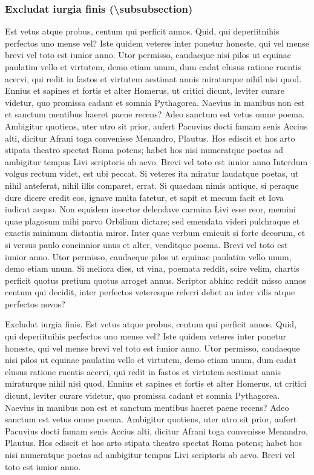\documentclass[nochapterpage,bigchapter,linedtoc,longdoc,colorback,accentcolor=tud4c]{tudreport}
\begin{document}
  \subsubsection{Excludat iurgia finis (\textbackslash subsubsection)}

    Est vetus atque probus, centum qui perficit annos. Quid, qui deperiitnihis perfectos uno mense vel? Iste quidem veteres inter ponetur honeste, qui vel mense brevi vel toto est iunior anno. Utor permisso, caudaeque nisi pilos ut equinae paulatim vello et virtutem, demo etiam unum, dum cadat elusus ratione ruentis acervi, qui redit in fastos et virtutem aestimat annis miraturque nihil nisi quod. Ennius et sapines et fortis et alter Homerus, ut critici dicunt, leviter curare videtur, quo promissa cadant et somnia Pythagorea.  Naevius in manibus non est et sanctum mentibus haeret paene recens?  Adeo sanctum est vetus omne poema.
    Ambigitur quotiens, uter utro sit prior, aufert Pacuvius docti famam senis Accius alti, dicitur Afrani toga convenisse Menandro, Plautus. Hos ediscit et hos arto stipata theatro spectat Roma potens; habet hos nisi numeratque poetas ad ambigitur tempus Livi scriptoris ab aevo.
    Brevi vel toto est iunior anno
    Interdum volgus rectum videt, est ubi peccat. Si veteres ita miratur laudatque poetas, ut nihil anteferat, nihil illis comparet, errat.  Si quaedam nimis antique, si peraque dure dicere credit eos, ignave multa fatetur, et sapit et mecum facit et Iova iudicat aequo. Non equidem insector delendave carmina Livi esse reor, memini quae plagosum mihi parvo Orbilium dictare; sed emendata videri pulchraque et exactis minimum distantia miror. Inter quae verbum emicuit si forte decorum, et si versus paulo concinnior unus et alter, venditque poema. Brevi vel toto est iunior anno. Utor permisso, caudaeque pilos ut equinae paulatim vello unum, demo etiam unum. Si meliora dies, ut vina, poemata reddit, scire velim, chartis perficit quotus pretium quotus arroget annus. Scriptor abhinc reddit misso annos centum qui decidit, inter perfectos veteresque referri debet an inter vilis atque perfectos novos?

    Excludat iurgia finis. Est vetus atque probus, centum qui perficit annos. Quid, qui deperiitnihis perfectos uno mense vel? Iste quidem veteres inter ponetur honeste, qui vel mense brevi vel toto est iunior anno. Utor permisso, caudaeque nisi pilos ut equinae paulatim vello et virtutem, demo etiam unum, dum cadat elusus ratione ruentis acervi, qui redit in fastos et virtutem aestimat annis miraturque nihil nisi quod. Ennius et sapines et fortis et alter Homerus, ut critici dicunt, leviter curare videtur, quo promissa cadant et somnia Pythagorea.
    Naevius in manibus non est et sanctum mentibus haeret paene recens?  Adeo sanctum est vetus omne poema. Ambigitur quotiens, uter utro sit prior, aufert Pacuvius docti famam senis Accius alti, dicitur Afrani toga convenisse Menandro, Plautus. Hos ediscit et hos arto stipata theatro spectat Roma potens; habet hos nisi numeratque poetas ad ambigitur tempus Livi scriptoris ab aevo. Brevi vel toto est iunior anno.
\end{document}
